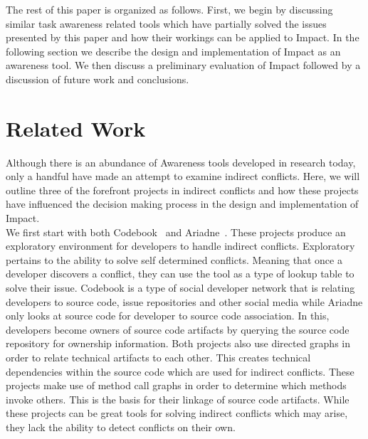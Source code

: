 \documentclass[conference]{IEEEtran}
\begin{document}
The rest of this paper is organized as follows. First, we begin by discussing
similar task awareness related tools which have partially solved the
issues presented by this paper and how their workings can be applied to 
Impact. In the following section we describe the design and implementation
of Impact as an awareness tool. We then discuss a preliminary evaluation of
Impact followed by a discussion of future work and conclusions.\\


\section{Related Work}
Although there is an abundance of Awareness tools developed in research
today, only a handful have made an attempt to examine indirect conflicts.
Here, we will outline three of the forefront projects in indirect conflicts
and how these projects have influenced the decision making process in
the design and implementation of Impact.\\

We first start with both Codebook~\cite{Begel:2010:CDE} and 
Ariadne~\cite{Trainer:2005:BGT}. These projects produce an exploratory
environment for developers to handle indirect conflicts. Exploratory
pertains to the ability to solve self determined conflicts. Meaning that
once a developer discovers a conflict, they can use the tool as a type of
lookup table to solve their issue. Codebook is a type of social developer
network that is relating developers to source code, issue repositories and
other social media while Ariadne only looks at source code for developer
to source code association. In this, developers become
owners of source code artifacts by querying the source code repository
for ownership information. Both projects also use directed graphs
in order to relate technical artifacts to each other. This creates technical
dependencies within the source code which are used for indirect
conflicts. These projects make use of method call graphs in order to 
determine which methods invoke others. This is the basis for their 
linkage of source code artifacts. While these projects can be great tools 
for solving indirect conflicts which may arise, they lack the ability to
detect conflicts on their own.\\
\end{document}
